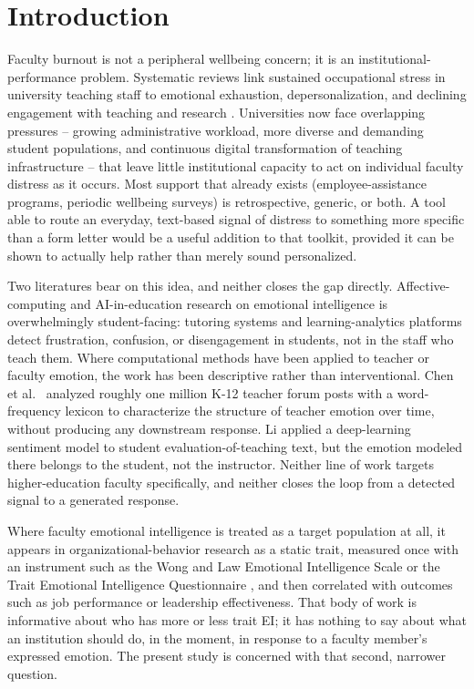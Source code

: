 \documentclass[higheredu,article,submit,pdftex,moreauthors]{Definitions/mdpi}
\begin{document}
\section{Introduction}

Faculty burnout is not a peripheral wellbeing concern; it is an institutional-performance problem. Systematic reviews link sustained occupational stress in university teaching staff to emotional exhaustion, depersonalization, and declining engagement with teaching and research \cite{watts2011}. Universities now face overlapping pressures -- growing administrative workload, more diverse and demanding student populations, and continuous digital transformation of teaching infrastructure -- that leave little institutional capacity to act on individual faculty distress as it occurs. Most support that already exists (employee-assistance programs, periodic wellbeing surveys) is retrospective, generic, or both. A tool able to route an everyday, text-based signal of distress to something more specific than a form letter would be a useful addition to that toolkit, provided it can be shown to actually help rather than merely sound personalized.

Two literatures bear on this idea, and neither closes the gap directly. Affective-computing and AI-in-education research on emotional intelligence is overwhelmingly student-facing: tutoring systems and learning-analytics platforms detect frustration, confusion, or disengagement in students, not in the staff who teach them. Where computational methods have been applied to teacher or faculty emotion, the work has been descriptive rather than interventional. Chen et al.\ \cite{chen2020} analyzed roughly one million K-12 teacher forum posts with a word-frequency lexicon to characterize the structure of teacher emotion over time, without producing any downstream response. Li \cite{li2022} applied a deep-learning sentiment model to student evaluation-of-teaching text, but the emotion modeled there belongs to the student, not the instructor. Neither line of work targets higher-education faculty specifically, and neither closes the loop from a detected signal to a generated response.

Where faculty emotional intelligence is treated as a target population at all, it appears in organizational-behavior research as a static trait, measured once with an instrument such as the Wong and Law Emotional Intelligence Scale \cite{wonglaw2002} or the Trait Emotional Intelligence Questionnaire \cite{petrides2009}, and then correlated with outcomes such as job performance or leadership effectiveness. That body of work is informative about who has more or less trait EI; it has nothing to say about what an institution should do, in the moment, in response to a faculty member's expressed emotion. The present study is concerned with that second, narrower question.
\end{document}
